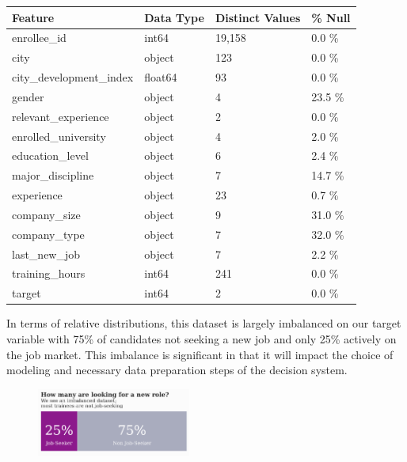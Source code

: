 \begin{table}[h]
\centering
\begin{tabular}{ |p{4cm}||p{2cm}| p{2.53cm}| p{1.5cm}|}
 \hline
 Feature 		& Data Type	& Distinct Values	& \% Null\\
 \hline
enrollee\_id 	& int64 & 19,158 & 0.0 \%	\\
city			 & object & 123 & 0.0 \% \\
city\_development\_index & float64 & 93 & 0.0 \% \\
gender		& object & 4 & 23.5 \% \\
relevant\_experience & object & 2 & 0.0 \%\\

enrolled\_university & object & 4 & 2.0 \% \\

education\_level & object & 6 & 2.4 \% \\

major\_discipline  & object & 7 & 14.7 \% \\

experience  	& object & 23 & 0.7 \% \\

company\_size 	& object & 9 & 31.0 \% \\

company\_type 	& object & 7 & 32.0 \%\\

last\_new\_job 	& object & 7 & 2.2 \%\\

training\_hours & int64 & 241 & 0.0 \%  \\

target 		 & int64 & 2 & 0.0 \% \\
 \hline
\end{tabular}
\end{table}


In terms of relative distributions, this dataset is largely imbalanced on our target variable with 75\% of candidates not seeking a new job and only 25\% actively on the job market.  This imbalance is significant in that it will impact the choice of modeling and necessary data preparation steps of the decision system.

\begin{figure}
    \centering
    \includegraphics[width=0.45\textwidth]{download}
\end{figure}

